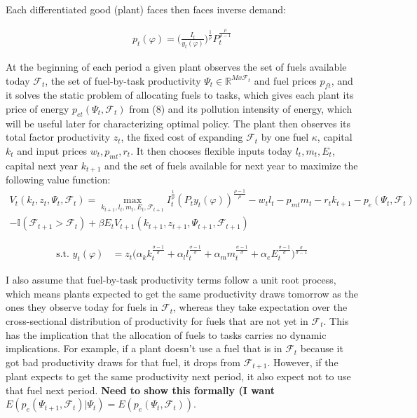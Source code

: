 \documentclass{article}
\begin{document}
Each differentiated good (plant) faces then faces inverse demand:

\begin{align}
    p_t(\varphi) = \Big( \frac{I_t}{y_t(\varphi)}\Big)^{\frac{1}{\rho}} P_t^{\frac{\rho}{\rho-1}}
\end{align}

At the beginning of each period a given plant observes the set of fuels available today $\mathcal{F}_t$, the set of fuel-by-task productivity $\Psi_t \in \mathbb{R}^{M x \mathcal{F}_t}$ and fuel prices $p_{ft}$, and it solves the static problem of allocating fuels to tasks, which gives each plant its price of energy $p_{et}(\Psi_t,\mathcal{F}_t)$ from (8) and its pollution intensity of energy, which will be useful later for characterizing optimal policy. The plant then observes its total factor productivity $z_t$, the fixed cost of expanding $\mathcal{F}_t$ by one fuel $\kappa$, capital $k_t$ and input prices $w_t,p_{mt}, r_{t}$. It then chooses flexible inputs today $l_t,m_t,E_t$, capital next year $k_{t+1}$ and the set of fuels available for next year to maximize the following value function: 
\begin{multline}
    V_t(k_t,z_t,\Psi_t,\mathcal{F}_t) = \max_{k_{t+1},l_t,m_t,E_t,\mathcal{F}_{t+1}}I_t^{\frac{1}{\rho}} (P_t y_t(\varphi))^{\frac{\rho-1}{\rho}} - w_t l_t - p_{mt}m_t - r_{t}k_{t+1} - p_e(\Psi_t,\mathcal{F}_t) \\ -\mathbb{I}(\mathcal{F}_{t+1} > \mathcal{F}_t)
    + \beta E_t V_{t+1}(k_{t+1},z_{t+1},\Psi_{t+1},\mathcal{F}_{t+1})
\end{multline}

\begin{align*}
    \text{s.t.  }     y_t(\varphi) &= z_t\Big( \alpha_k k_t^{\frac{\sigma-1}{\sigma}} + \alpha_l l_t^{\frac{\sigma-1}{\sigma}} + \alpha_m m_t^{\frac{\sigma-1}{\sigma}} + \alpha_e E_t^{\frac{\sigma-1}{\sigma}}\Big)^{\frac{\sigma}{\sigma-1}}
\end{align*}

I also assume that fuel-by-task productivity terms follow a unit root process, which means plants expected to get the same productivity draws tomorrow as the ones they observe today for fuels in $\mathcal{F}_t$, whereas they take expectation over the cross-sectional distribution of productivity for fuels that are not yet in $\mathcal{F}_t$. This has the implication that the allocation of fuels to tasks carries no dynamic implications. For example, if a plant doesn't use a fuel that is in $\mathcal{F}_t$ because it got bad productivity draws for that fuel, it drops from $\mathcal{F}_{t+1}$. However, if the plant expects to get the same productivity next period, it also expect not to use that fuel next period. \textbf{Need to show this formally (I want $E(p_e(\Psi_{t+1},\mathcal{F}_t)|\Psi_t) = E(p_e(\Psi_t,\mathcal{F}_t))$}. 
\end{document}
